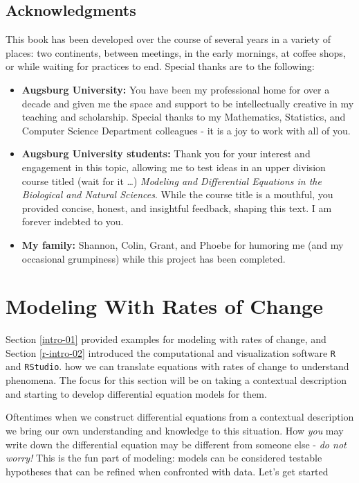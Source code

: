 \documentclass[
]{krantz}
\theoremstyle{definition}
\theoremstyle{definition}
\theoremstyle{definition}
\theoremstyle{definition}
\theoremstyle{remark}
\begin{document}
\hypertarget{acknowledgments}{%
\section*{Acknowledgments}\label{acknowledgments}}


This book has been developed over the course of several years in a variety of places: two continents, between meetings, in the early mornings, at coffee shops, or while waiting for practices to end. Special thanks are to the following:

\begin{itemize}
\item
  \textbf{Augsburg University:} You have been my professional home for over a decade and given me the space and support to be intellectually creative in my teaching and scholarship. Special thanks to my Mathematics, Statistics, and Computer Science Department colleagues - it is a joy to work with all of you.
\item
  \textbf{Augsburg University students:} Thank you for your interest and engagement in this topic, allowing me to test ideas in an upper division course titled (wait for it \ldots) \emph{Modeling and Differential Equations in the Biological and Natural Sciences}. While the course title is a mouthful, you provided concise, honest, and insightful feedback, shaping this text. I am forever indebted to you.
\item
  \textbf{My family:} Shannon, Colin, Grant, and Phoebe for humoring me (and my occasional grumpiness) while this project has been completed.
\end{itemize}

\mainmatter

\hypertarget{modeling-rates-03}{%
\chapter{Modeling With Rates of Change}\label{modeling-rates-03}}

Section \ref{intro-01} provided examples for modeling with rates of change, and Section \ref{r-intro-02} introduced the computational and visualization software \texttt{R} and \texttt{RStudio}. how we can translate equations with rates of change to understand phenomena. The focus for this section will be on taking a contextual description and starting to develop differential equation models for them.

Oftentimes when we construct differential equations from a contextual description we bring our own understanding and knowledge to this situation. How \emph{you} may write down the differential equation may be different from someone else - \emph{do not worry!} This is the fun part of modeling: models can be considered testable hypotheses that can be refined when confronted with data. Let's get started
\end{document}
